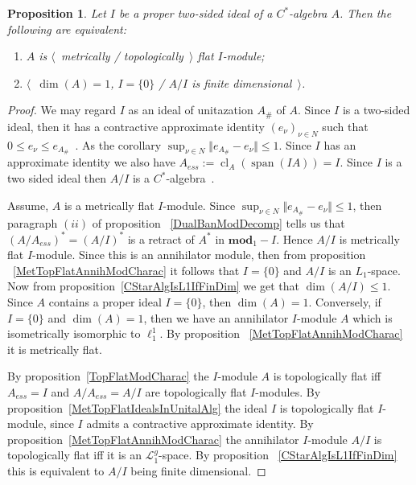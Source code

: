 \documentclass[12pt]{article}
\newtheorem{proposition}[theorem]{Proposition}
\begin{document}
\begin{proposition}\label{CStarAlgIsTopFlatOverItsIdeal} Let $I$ be a proper
two-sided ideal of a  $C^*$-algebra $A$. Then the following are equivalent:
\begin{enumerate}[label = (\roman*)]
\item $A$ is $\langle$~metrically / topologically~$\rangle$ flat $I$-module;
\item $\langle$~$\operatorname{dim}(A)=1$, $I= \{0 \}$ / $A/I$ is finite
dimensional~$\rangle$.
\end{enumerate}
\end{proposition}
\begin{proof} We may regard $I$ as an  ideal of unitazation $A_\#$ of $A$. Since
$I$ is a two-sided ideal, then it has a contractive approximate identity
${(e_\nu)}_{\nu\in N}$ such that $0\leq e_\nu\leq e_{A_\#}$~\cite[proposition
4.7.79]{HelBanLocConvAlg}. As the corollary $\sup_{\nu\in N}\Vert
e_{A_\#}-e_\nu\Vert\leq 1$. Since $I$ has an approximate identity we also have
$A_{ess}:=\operatorname{cl}_A(\operatorname{span}(IA))=I$. Since $I$ is a two
sided ideal then $A/I$ is a $C^*$-algebra~\cite[theorem
4.7.81]{HelBanLocConvAlg}.

Assume, $A$ is a metrically flat $I$-module. Since $\sup_{\nu\in N}\Vert
e_{A_\#}-e_\nu\Vert\leq 1$, then paragraph $(ii)$ of proposition
~\ref{DualBanModDecomp} tells us that ${(A/A_{ess})}^*={(A/I)}^*$ is a retract
of $A^*$ in $\mathbf{mod}_1-I$. Hence $A/I$ is metrically flat $I$-module. Since
this is an annihilator module, then from proposition
~\ref{MetTopFlatAnnihModCharac} it follows that $I= \{0 \}$ and $A/I$ is an
$L_1$-space. Now from proposition~\ref{CStarAlgIsL1IfFinDim} we get that
$\operatorname{dim}(A/I)\leq 1$. Since $A$ contains a proper ideal $I= \{0 \}$,
then $\operatorname{dim}(A)=1$. Conversely, if $I= \{0 \}$ and
$\operatorname{dim}(A)=1$, then we have an annihilator $I$-module $A$ which is
isometrically isomorphic to $\ell_1^1$. By proposition
~\ref{MetTopFlatAnnihModCharac} it is metrically flat.

By proposition~\ref{TopFlatModCharac} the $I$-module $A$ is topologically flat
iff $A_{ess}=I$ and $A/A_{ess}=A/I$ are topologically flat $I$-modules. By
proposition~\ref{MetTopFlatIdealsInUnitalAlg} the ideal $I$ is topologically
flat $I$-module, since $I$ admits a contractive approximate identity. By
proposition~\ref{MetTopFlatAnnihModCharac} the annihilator $I$-module $A/I$ is
topologically flat iff it is an $\mathcal{L}_1^g$-space. By proposition
~\ref{CStarAlgIsL1IfFinDim} this is equivalent to $A/I$ being finite
dimensional.
\end{proof}
\end{document}
